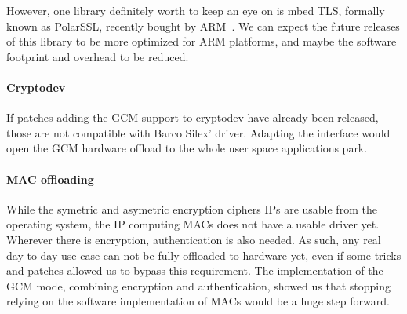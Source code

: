 However, one library definitely worth to keep an eye on is mbed TLS, formally known as PolarSSL, recently bought by ARM~\cite{2015-arm-buy-polarssl}.
We can expect the future releases of this library to be more optimized for ARM platforms, and maybe the software footprint and overhead to be reduced.


\paragraph{Cryptodev}
If patches adding the GCM support to cryptodev have already been released, those are not compatible with Barco Silex' driver.
Adapting the interface would open the GCM hardware offload to the whole user space applications park.

\paragraph{MAC offloading}
While the symetric and asymetric encryption ciphers IPs are usable from the operating system, the IP computing MACs does not have a usable driver yet.
Wherever there is encryption, authentication is also needed.
As such, any real day-to-day use case can not be fully offloaded to hardware yet, even if some tricks and patches allowed us to bypass this requirement.
The implementation of the GCM mode, combining encryption and authentication, showed us that stopping relying on the software implementation of MACs would be a huge step forward.


